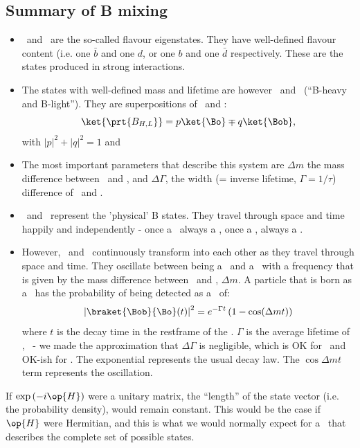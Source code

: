 \subsection{Summary of B mixing}
\label{sec:BMixSummary}
\begin{itemize}
 \item \Bdo\ and \Bdob\ are the so-called flavour eigenstates. They
 have well-defined flavour content (i.e. one $\bar{b}$ and one $d$, or
 one $b$ and one $\bar{d}$ respectively. These are the states produced
 in strong interactions.
 \item The states with well-defined mass and lifetime are however \Bh\
 and \Bl\ (``B-heavy and B-light''). They are superpositions of \Bdo\
 and \Bdob:
\begin{equation}
\label{eq:th.a.def_Bl_Bh_2}
\ket{\prt{B_{H,L}}} = p \ket{\Bo} \mp q \ket{\Bob},
\end{equation}
with $|p|^2 + |q|^2 = 1$ and 
  \item The most important parameters that describe this system are
 $\Delta m$ the mass difference between \Bh\ and \Bl, and
 $\Delta\Gamma$, the width (= inverse lifetime, $\Gamma = 1/\tau$)
 difference of \Bh\ and \Bl.
 \item \Bh\ and \Bl\ represent the 'physical' B states. They travel
 through space and time happily and independently - once a \Bh\ always
 a \Bh, once a \Bl, always a \Bl.
  \item However, \Bo\ and \Bob\ continuously transform into each other
  as they travel through space and time. They oscillate between being
  a \Bo\ and a \Bob\ with a frequency that is given by the mass
  difference between \Bh\ and \Bl, $\Delta m$.
A particle that is born as a \Bo\ has the probability of being
  detected as a \Bob\ of:
\begin{equation}
\left| \braket{\Bob}{\Bo}(t) \right|^2 = e^{-\Gamma t} \left(1 - \cos
(\Delta m t)\right)
\end{equation}
 where $t$ is the decay time in the restframe of the \Bo. $\Gamma$ is
 the average lifetime of \Bh, \Bl\ - we made the approximation that
 $\Delta\Gamma$ is negligible, which is OK for \Bdo\ and OK-ish for
 \Bso. The exponential represents the
 usual decay law. The $\cos \Delta m t$ term represents the
 oscillation.
\end{itemize}




 If $\exp\left(-i\op{H}\right)$ were a unitary matrix, the ``length''
 of the state vector (i.e. the probability density), would remain
 constant. This would be the case if $\op{H}$ were Hermitian, and this
 is what we would normally expect for a \Se\ that describes the
 complete set of possible states.
 

